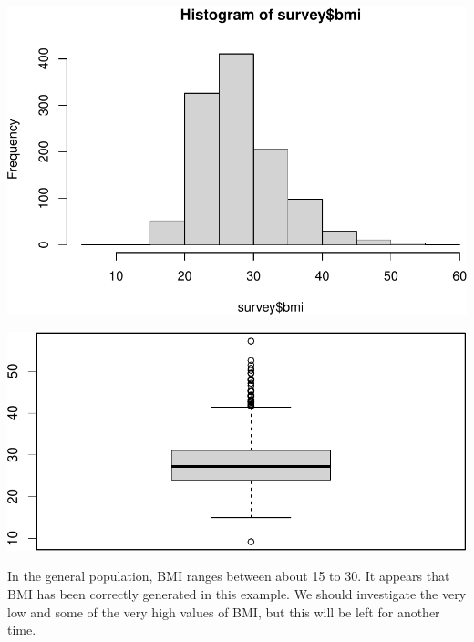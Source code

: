 \documentclass[
]{memoir}
\newenvironment{Shaded}{\begin{snugshade}}{\end{snugshade}}
\newcommand{\FunctionTok}[1]{\textcolor[rgb]{0.00,0.00,0.00}{#1}}
\newcommand{\NormalTok}[1]{#1}
\newcommand{\SpecialCharTok}[1]{\textcolor[rgb]{0.00,0.00,0.00}{#1}}
\begin{document}
\begin{Shaded}
\end{Shaded}

\includegraphics{phcm9795-R-notes_files/figure-latex/unnamed-chunk-64-1.pdf}

\begin{Shaded}
\end{Shaded}

\includegraphics{phcm9795-R-notes_files/figure-latex/unnamed-chunk-64-2.pdf}

In the general population, BMI ranges between about 15 to 30. It appears that BMI has been correctly generated in this example. We should investigate the very low and some of the very high values of BMI, but this will be left for another time.
\end{document}
